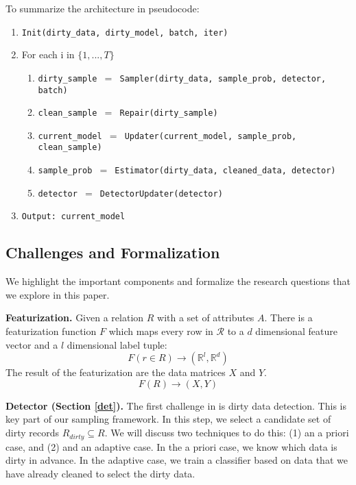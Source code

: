 To summarize the architecture in pseudocode:
\begin{enumerate}\scriptsize\sloppy
\item \texttt{Init(dirty\_data, dirty\_model, batch, iter)}
\item For each i in $\{1,...,T\}$
\begin{enumerate}
	\item \texttt{dirty\_sample $=$ Sampler(dirty\_data, sample\_prob, detector, batch)}
	\item \texttt{clean\_sample $=$ Repair(dirty\_sample)}
	\item \texttt{current\_model $=$ Updater(current\_model, sample\_prob, clean\_sample)}
	\item \texttt{sample\_prob $=$ Estimator(dirty\_data, cleaned\_data, detector)}
	\item \texttt{detector $=$ DetectorUpdater(detector)}
\end{enumerate}
\item \texttt{Output: current\_model}
\end{enumerate}

\subsection{Challenges and Formalization}
We highlight the important components and formalize the research questions that we explore in this paper. 

\vspace{0.5em}

\noindent \textbf{Featurization. } Given a relation $R$ with a set of attributes $A$.
There is a featurization function $F$ which maps every row in $\mathcal{R}$ to a $d$ dimensional feature vector and a $l$ dimensional label tuple: 
\[F(r \in R) \rightarrow (\mathbb{R}^l, \mathbb{R}^d)\]
The result of the featurization are the data matrices $X$ and $Y$.
\[
F(R)\rightarrow (X,Y)
\]

\vspace{0.5em}

\noindent\textbf{Detector (Section \ref{det}). } The first challenge in \sys is dirty data detection. This is key part of our sampling framework. In this step, we select a candidate set of dirty records $R_{dirty} \subseteq R$. We will discuss two techniques to do this: (1) an a priori case, and (2) and an adaptive case. In the a priori case, we know which data is dirty in advance. In the adaptive case, we train a classifier based on data that we have already cleaned to select the dirty data.

